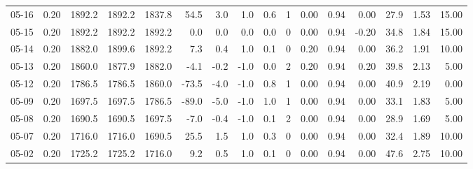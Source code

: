 \begin{threeparttable}
{\begin{tabular}{lrrrrrrrrrrrrrrr}
  05-16 &     0.20 & 1892.2 & 1892.2 & 1837.8 &       54.5 &            3.0 &                      1.0 &                 0.6 &              1 &       0.00 &      0.94 &           0.00 &             27.9 &            1.53 &                  15.00 \\
  05-15 &     0.20 & 1892.2 & 1892.2 & 1892.2 &        0.0 &            0.0 &                      0.0 &                 0.0 &              0 &       0.00 &      0.94 &          -0.20 &             34.8 &            1.84 &                  15.00 \\
  05-14 &     0.20 & 1882.0 & 1899.6 & 1892.2 &        7.3 &            0.4 &                      1.0 &                 0.1 &              0 &       0.20 &      0.94 &           0.00 &             36.2 &            1.91 &                  10.00 \\
  05-13 &     0.20 & 1860.0 & 1877.9 & 1882.0 &       -4.1 &           -0.2 &                     -1.0 &                 0.0 &              2 &       0.20 &      0.94 &           0.20 &             39.8 &            2.13 &                   5.00 \\
  05-12 &     0.20 & 1786.5 & 1786.5 & 1860.0 &      -73.5 &           -4.0 &                     -1.0 &                 0.8 &              1 &       0.00 &      0.94 &           0.00 &             40.9 &            2.19 &                   0.00 \\
  05-09 &     0.20 & 1697.5 & 1697.5 & 1786.5 &      -89.0 &           -5.0 &                     -1.0 &                 1.0 &              1 &       0.00 &      0.94 &           0.00 &             33.1 &            1.83 &                   5.00 \\
  05-08 &     0.20 & 1690.5 & 1690.5 & 1697.5 &       -7.0 &           -0.4 &                     -1.0 &                 0.1 &              2 &       0.00 &      0.94 &           0.00 &             28.9 &            1.69 &                   5.00 \\
  05-07 &     0.20 & 1716.0 & 1716.0 & 1690.5 &       25.5 &            1.5 &                      1.0 &                 0.3 &              0 &       0.00 &      0.94 &           0.00 &             32.4 &            1.89 &                  10.00 \\
  05-02 &     0.20 & 1725.2 & 1725.2 & 1716.0 &        9.2 &            0.5 &                      1.0 &                 0.1 &              0 &       0.00 &      0.94 &           0.00 &             47.6 &            2.75 &                  10.00 \\

\end{tabular}}
\end{threeparttable}
